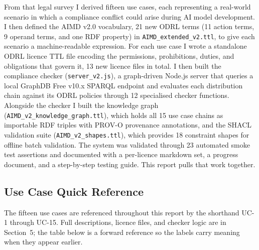 \documentclass[12pt,a4paper]{article}
\begin{document}
From that legal survey I derived fifteen use cases, each representing a real-world scenario in which a compliance conflict could arise during AI model development. I then defined the AIMD v2.0 vocabulary, 21 new ODRL terms (11 action terms, 9 operand terms, and one RDF property) in \texttt{AIMD\_extended\_v2.ttl}, to give each scenario a machine-readable expression. For each use case I wrote a standalone ODRL licence TTL file encoding the permissions, prohibitions, duties, and obligations that govern it, 13 new licence files in total. I then built the compliance checker (\texttt{server\_v2.js}), a graph-driven Node.js server that queries a local GraphDB Free v10.x SPARQL endpoint and evaluates each distribution chain against its ODRL policies through 12 specialised checker functions. Alongside the checker I built the knowledge graph (\texttt{AIMD\_v2\_knowledge\_graph.ttl}), which holds all 15 use case chains as importable RDF triples with PROV-O provenance annotations, and the SHACL validation suite (\texttt{AIMD\_v2\_shapes.ttl}), which provides 18 constraint shapes for offline batch validation. The system was validated through 23 automated smoke test assertions and documented with a per-licence markdown set, a progress document, and a step-by-step testing guide. This report pulls that work together.

\subsection*{Use Case Quick Reference}

The fifteen use cases are referenced throughout this report by the shorthand UC-1 through UC-15. Full descriptions, licence files, and checker logic are in Section~5; the table below is a forward reference so the labels carry meaning when they appear earlier.
\end{document}
